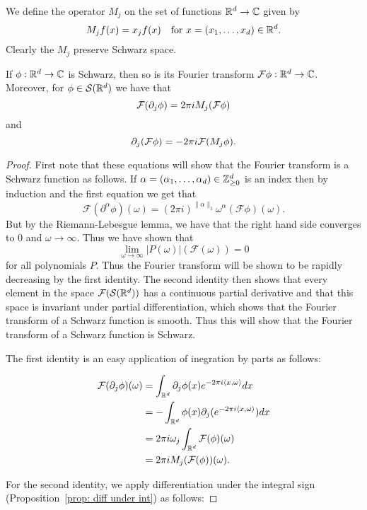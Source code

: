 \documentclass[twoside, a4paper, 10pt]{amsart}
\begin{document}
We define the operator $M_j$ on the set of functions $\mathbb{R}^d \to \mathbb{C}$ given by $$M_jf (x) = x_j f(x) \quad\text{for } x=(x_1, \ldots, x_d) \in \mathbb{R}^d.$$ Clearly the $M_j$ preserve Schwarz space.

\begin{thm}\label{thm: Fourier transform properties} If $\phi:\mathbb{R}^d \to \mathbb{C}$ is Schwarz, then so is its Fourier transform $\mathcal{F}\phi:\mathbb{R}^d \to \mathbb{C}$. Moreover, for $\phi \in \mathcal{S}(\mathbb{R}^d)$ we have that $$ \mathcal{F}(\partial_j \phi) = 2\pi i M_j (\mathcal{F} \phi) $$ and $$\partial_j (\mathcal{F} \phi) = -2\pi i \mathcal{F}(M_j \phi).$$

\end{thm}

\begin{proof} First note that these equations will show that the Fourier transform is a Schwarz function as follows. If $\alpha = (\alpha_1, \ldots, \alpha_d) \in \mathbb{Z}_{\geq 0}^d$ is an index then by induction and the first equation we get that $$\mathcal{F}(\partial^{\alpha}\phi)(\omega) = (2\pi i)^{\|\alpha\|_1} \omega^{\alpha} (\mathcal{F}\phi)(\omega).$$ But by the Riemann-Lebesgue lemma, we have that the right hand side converges to $0$ and $\omega \to \infty$. Thus we have shown that $$\lim_{\omega \to \infty} |P(\omega)| (\mathcal{F}(\omega)) = 0$$ for all polynomials $P$. Thus the Fourier transform will be shown to be rapidly decreasing by the first identity. The second identity then shows that every element in the space $\mathcal{F}(\mathcal{S}(\mathbb{R}^d))$ has a continuous partial derivative and that this space is invariant under partial differentiation, which shows that the Fourier transform of a Schwarz function is smooth. Thus this will show that the Fourier transform of a Schwarz function is Schwarz.

The first identity is an easy application of inegration by parts as follows:

\begin{align*} \mathcal{F}(\partial_j \phi) (\omega) &= \int_{\mathbb{R}^d} \partial_j\phi(x) e^{-2\pi i \langle x, \omega \rangle} dx 
\\ &= -\int_{\mathbb{R}^d} \phi(x) \partial_j (e^{-2\pi i \langle x, \omega \rangle}) dx
\\ &= 2\pi i \omega_j \int_{\mathbb{R}^d} \mathcal{F}(\phi) (\omega)
\\& = 2\pi i M_j (\mathcal{F}(\phi)) (\omega).\end{align*}

For the second identity, we apply differentiation under the integral sign (Proposition~\ref{prop: diff under int}) as follows:


\end{proof}
\end{document}
